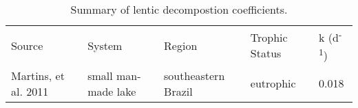\begin{table}
\label{tab:k_summary}
\begin{tabular}{l l l l l}
Source               & System              & Region              & Trophic Status & k (d\textsuperscript{-1}) \\
Martins, et al. 2011 & small man-made lake & southeastern Brazil & eutrophic      & 0.018 \\



\end{tabular}
\caption{Summary of lentic decompostion coefficients.}
\end{table}